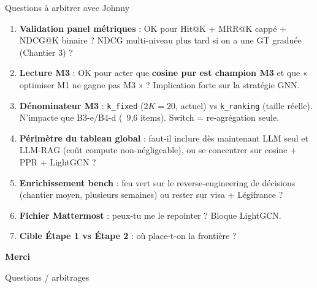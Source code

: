 \documentclass[aspectratio=169,10pt]{beamer}
\begin{document}
\begin{frame}{Questions à arbitrer avec Johnny}
  \footnotesize
  \begin{enumerate}\setlength{\itemsep}{0.3em}
    \item \textbf{Validation panel métriques} : OK pour Hit@K + MRR@K cappé + NDCG@K binaire ?
    NDCG multi-niveau plus tard si on a une GT graduée (Chantier 3) ?
    \item \textbf{Lecture M3} : OK pour acter que \textbf{cosine pur est champion M3} et que
    « optimiser M1 ne gagne pas M3 » ? Implication forte sur la stratégie GNN.
    \item \textbf{Dénominateur M3} : \texttt{k\_fixed} ($2K{=}20$, actuel) vs \texttt{k\_ranking}
    (taille réelle). N'impacte que B3-e/B4-d (~9,6 items). Switch = re-agrégation seule.
    \item \textbf{Périmètre du tableau global} : faut-il inclure dès maintenant LLM seul
    et LLM-RAG (coût compute non-négligeable), ou se concentrer sur cosine + PPR + LightGCN ?
    \item \textbf{Enrichissement bench} : feu vert sur le reverse-engineering de décisions
    (chantier moyen, plusieurs semaines) ou rester sur visa + Légifrance ?
    \item \textbf{Fichier Mattermost} : peux-tu me le repointer ? Bloque LightGCN.
    \item \textbf{Cible Étape 1 vs Étape 2} : où place-t-on la frontière ?
  \end{enumerate}
\end{frame}

\begin{frame}
  \begin{center}
  \vspace{2em}
  \Huge\textcolor{accent}{\textbf{Merci}}

  \vspace{2em}
  \large Questions / arbitrages
  \end{center}
\end{frame}
\end{document}
